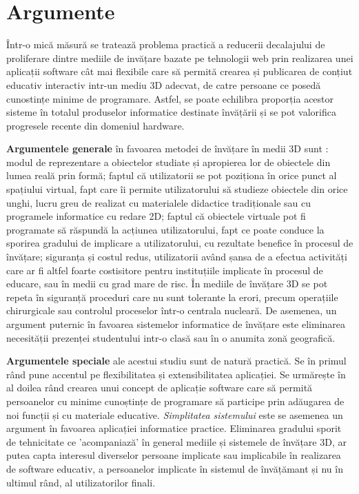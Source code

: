 \section{Argumente}
\par Într-o mică măsură se tratează problema practică a reducerii decalajului de proliferare dintre mediile de invățare bazate pe tehnologii web prin realizarea unei aplicații software cât mai flexibile care să permită crearea și publicarea de conțiut educativ interactiv intr-un mediu 3D adecvat, de catre persoane ce posedă cunostințe minime de programare. Astfel, se poate echilibra proporția acestor sisteme în totalul produselor informatice destinate învățării și se pot valorifica progresele recente din domeniul hardware.
\par \textbf{Argumentele generale} în favoarea metodei de învățare în medii 3D sunt : modul de reprezentare a obiectelor studiate și apropierea lor de obiectele din lumea reală prin formă; faptul că utilizatorii se pot poziționa în orice punct al spațiului virtual, fapt care îi permite utilizatorului să studieze obiectele din orice unghi, lucru greu de realizat cu materialele didactice tradiționale sau cu programele informatice cu redare 2D; faptul că obiectele virtuale pot fi programate să răspundă la acțiunea utilizatorului, fapt ce poate conduce la sporirea gradului de implicare a utilizatorului, cu rezultate benefice în procesul de învățare; siguranța și costul redus, utilizatorii având șansa de a efectua activități care ar fi altfel foarte costisitore pentru instituțiile implicate în procesul de educare, sau în medii cu grad mare de risc. În mediile de învățare 3D se pot repeta în siguranță proceduri care nu sunt tolerante la erori, precum operațiile chirurgicale sau controlul proceselor într-o centrala nucleară. De asemenea, un argument puternic în favoarea sistemelor informatice de învățare este eliminarea necesității prezenței studentului intr-o clasă sau în o anumita zonă geografică.
\par \textbf{Argumentele speciale} ale acestui studiu sunt de natură practică. Se în primul rând pune accentul pe flexibilitatea și extensibilitatea aplicației. Se urmărește în al doilea rând crearea unui concept de aplicație software care să permită persoanelor cu minime cunoștințe de programare să participe prin adăugarea de noi funcții și cu materiale educative.
\textit{Simplitatea sistemului} este se asemenea un argument în favoarea aplicației informatice practice. Eliminarea gradului sporit de tehnicitate ce 'acompaniază' în general mediile și sistemele de învățare 3D, ar putea capta interesul diverselor persoane implicate sau implicabile în realizarea de software educativ, a persoanelor implicate în sistemul de învățămant și nu în ultimul rând, al utilizatorilor finali.

